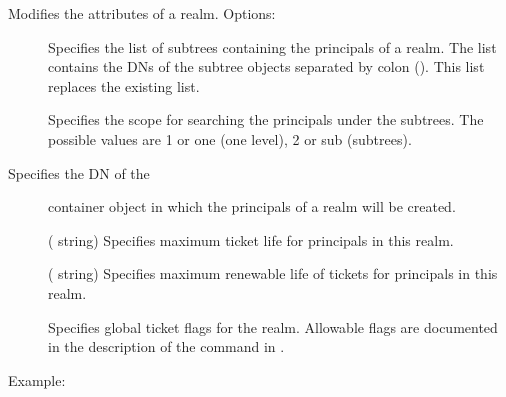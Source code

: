 \documentclass[letterpaper,10pt,english]{sphinxmanual}
\begin{document}
\sphinxAtStartPar
Modifies the attributes of a realm.  Options:
\begin{description}
\item[{ }] \leavevmode
\sphinxAtStartPar
Specifies the list of subtrees containing the principals of a
realm.  The list contains the DNs of the subtree objects separated
by colon (\sphinxcode{\sphinxupquote{:}}).  This list replaces the existing list.

\item[{ }] \leavevmode
\sphinxAtStartPar
Specifies the scope for searching the principals under the
subtrees.  The possible values are 1 or one (one level), 2 or sub
(subtrees).

\item[{  Specifies the DN of the}] \leavevmode
\sphinxAtStartPar
container object in which the principals of a realm will be
created.

\item[{ }] \leavevmode
\sphinxAtStartPar
( string) Specifies maximum ticket life for
principals in this realm.

\item[{ }] \leavevmode
\sphinxAtStartPar
( string) Specifies maximum renewable life of
tickets for principals in this realm.

\item[{}] \leavevmode
\sphinxAtStartPar
Specifies global ticket flags for the realm.  Allowable flags are
documented in the description of the  command in
{\hyperref[\detokenize{admin/admin_commands/kadmin_local:kadmin-1}]{}}.

\end{description}

\sphinxAtStartPar
Example:

\begin{sphinxVerbatim}[commandchars=\\\{\}]
      
      
  
\end{sphinxVerbatim}
\end{document}
